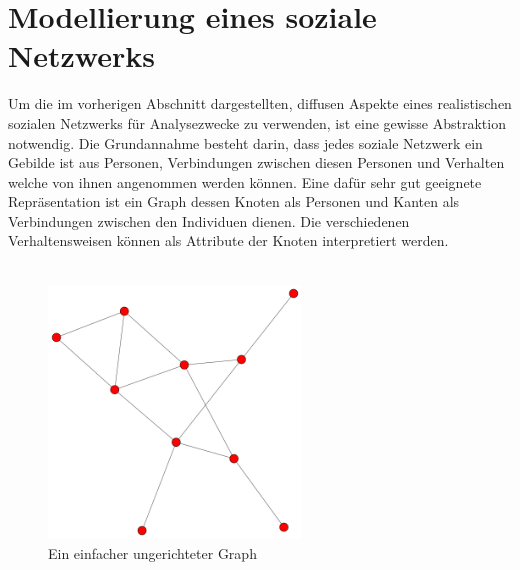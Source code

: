 \documentclass[12pt]{article}
\begin{document}
\section{Modellierung eines soziale Netzwerks}
Um die im vorherigen Abschnitt dargestellten, diffusen Aspekte eines realistischen sozialen Netzwerks für Analysezwecke zu verwenden, ist eine gewisse Abstraktion notwendig. Die Grundannahme besteht darin, dass jedes soziale Netzwerk ein Gebilde ist aus Personen, Verbindungen zwischen diesen Personen und Verhalten welche von ihnen angenommen werden können. Eine dafür sehr gut geeignete Repräsentation ist ein Graph dessen Knoten als Personen und Kanten als Verbindungen zwischen den Individuen dienen. Die verschiedenen Verhaltensweisen können als Attribute der Knoten interpretiert werden.\\\\

\begin{figure}
  \begin{center}
    \includegraphics[width=0.60\textwidth]{pic_simpleGraph.png}
  \end{center}
  \caption{Ein einfacher ungerichteter Graph}
\end{figure}
\end{document}
